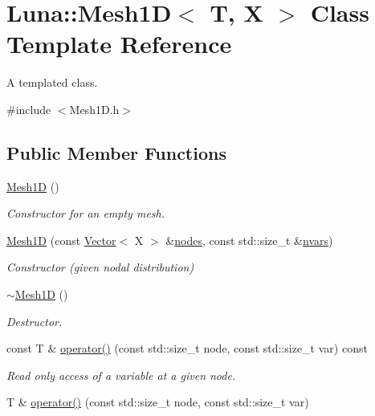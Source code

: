\hypertarget{classLuna_1_1Mesh1D}{}\section{Luna\+:\+:Mesh1D$<$ T, X $>$ Class Template Reference}
\label{classLuna_1_1Mesh1D}


A templated class.  




{\ttfamily \#include $<$Mesh1\+D.\+h$>$}

\subsection*{Public Member Functions}
\begin{DoxyCompactItemize}
\item 
\hyperlink{classLuna_1_1Mesh1D_a84574dba756de3111663ffadd973b91d}{Mesh1D} ()
\begin{DoxyCompactList}\small\item\em Constructor for an empty mesh. \end{DoxyCompactList}\item 
\hyperlink{classLuna_1_1Mesh1D_a9ef6bded127b6f27218f80b763564f46}{Mesh1D} (const \hyperlink{classLuna_1_1Vector}{Vector}$<$ X $>$ \&\hyperlink{classLuna_1_1Mesh1D_a628f377e1a2d66a8ff53d052dcc697e2}{nodes}, const std\+::size\+\_\+t \&\hyperlink{classLuna_1_1Mesh1D_a6cf5a08c5464bc7de45376cf3f5c1a68}{nvars})
\begin{DoxyCompactList}\small\item\em Constructor (given nodal distribution) \end{DoxyCompactList}\item 
\hyperlink{classLuna_1_1Mesh1D_afa5fc0086cfba00000b492fcde59e12f}{$\sim$\+Mesh1D} ()
\begin{DoxyCompactList}\small\item\em Destructor. \end{DoxyCompactList}\item 
const T \& \hyperlink{classLuna_1_1Mesh1D_a948c14c9fb7ac229a110910015e60ac8}{operator()} (const std\+::size\+\_\+t node, const std\+::size\+\_\+t var) const
\begin{DoxyCompactList}\small\item\em Read only access of a variable at a given node. \end{DoxyCompactList}\item 
T \& \hyperlink{classLuna_1_1Mesh1D_ae52f29ef7e30fd3d8c1bca421b55f5d4}{operator()} (const std\+::size\+\_\+t node, const std\+::size\+\_\+t var)

\end{DoxyCompactItemize}
